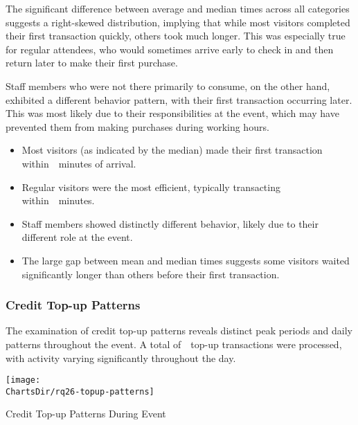 The significant difference between average and median times across all categories suggests a right-skewed distribution, implying that while most visitors completed their first transaction quickly, others took much longer.
This was especially true for regular attendees, who would sometimes arrive early to check in and then return later to make their first purchase.

Staff members who were not there primarily to consume, on the other hand, exhibited a different behavior pattern, with their first transaction occurring later.
This was most likely due to their responsibilities at the event, which may have prevented them from making purchases during working hours.

\begin{keytakeaways}
	\begin{itemize}
		\item Most visitors (as indicated by the median) made their first transaction within~~minutes of arrival.
		\item Regular visitors were the most efficient, typically transacting within~~minutes.
		\item Staff members showed distinctly different behavior, likely due to their different role at the event.
		\item The large gap between mean and median times suggests some visitors waited significantly longer than others before their first transaction.
	\end{itemize}
\end{keytakeaways}


\subsubsection{Credit Top-up Patterns}
\label{subsubsec:analysis-credit-topup}


The examination of credit top-up patterns reveals distinct peak periods and daily patterns throughout the event.
A total of~~top-up transactions were processed, with activity varying significantly throughout the day.

\begin{chart}[H]
	\centering
	\texttt{[image: \\ChartsDir/rq26-topup-patterns]}
	\caption{ Credit Top-up Patterns During Event}
	\label{chart:topup-patterns}
	\source
\end{chart}

